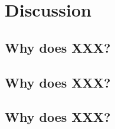 \section{Discussion}

\subsection{Why does XXX?}
\label{whybetter1}
\lipsum[4]

\subsection{Why does XXX?}
\label{whybetter2}
\lipsum[4]

\subsection{Why does XXX?}
\label{whybetter3}
\lipsum[4]
